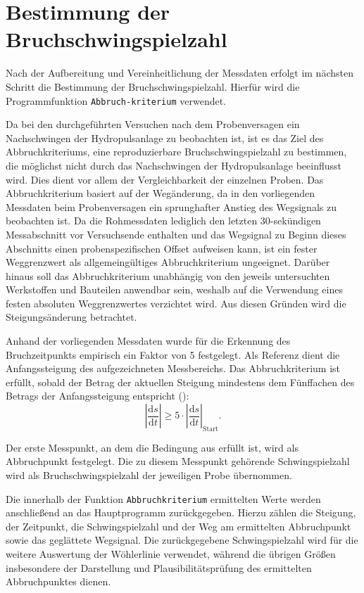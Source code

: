 	\section{Bestimmung der Bruchschwingspielzahl}
	Nach der Aufbereitung und Vereinheitlichung der Messdaten erfolgt im nächsten Schritt die Bestimmung der Bruchschwingspielzahl. Hierfür wird die Programmfunktion \texttt{Abbruch-\newline kriterium} verwendet.
	 
	 Da bei den durchgeführten Versuchen nach dem Probenversagen ein Nachschwingen der Hydropulsanlage zu beobachten ist, ist es das Ziel des Abbruchkriteriums, eine reproduzierbare Bruchschwingspielzahl zu bestimmen, die möglichst nicht durch das Nachschwingen der Hydropulsanlage beeinflusst wird. Dies dient vor allem der Vergleichbarkeit der einzelnen Proben. Das Abbruchkriterium basiert auf der Wegänderung, da in den vorliegenden Messdaten beim Probenversagen ein sprunghafter Anstieg des Wegsignals zu beobachten ist. Da die Rohmessdaten lediglich den letzten 30-sekündigen Messabschnitt vor Versuchsende enthalten und das Wegsignal zu Beginn dieses Abschnitts einen probenspezifischen Offset aufweisen kann, ist ein fester Weggrenzwert als allgemeingültiges Abbruchkriterium ungeeignet. Darüber hinaus soll das Abbruchkriterium unabhängig von den jeweils untersuchten Werkstoffen und Bauteilen anwendbar sein, weshalb auf die Verwendung eines festen absoluten Weggrenzwertes verzichtet wird. Aus diesen Gründen wird die Steigungsänderung betrachtet.
	 
	 Anhand der vorliegenden Messdaten wurde für die Erkennung des Bruchzeitpunkts empirisch ein Faktor von 5 festgelegt. Als Referenz dient die Anfangssteigung des aufgezeichneten Messbereichs. Das Abbruchkriterium ist erfüllt, sobald der Betrag der aktuellen Steigung mindestens dem Fünffachen des Betrags der Anfangssteigung entspricht ():
\begin{equation}
    \left|\frac{\mathrm{d}s}{\mathrm{d}t}\right|
    \geq
    5 \cdot
    \left|\frac{\mathrm{d}s}{\mathrm{d}t}\right|_{\mathrm{Start}}.
    \label{eq:Abbruchkriterium}
\end{equation}
	 
	 Der erste Messpunkt, an dem die Bedingung aus  erfüllt ist, wird als Abbruchpunkt festgelegt. 
Die zu diesem Messpunkt gehörende Schwingspielzahl wird als Bruchschwingspielzahl der jeweiligen Probe übernommen.

Die innerhalb der Funktion \texttt{Abbruchkriterium} ermittelten Werte werden 
anschließend an das Hauptprogramm zurückgegeben. Hierzu zählen die Steigung, 
der Zeitpunkt, die Schwingspielzahl und der Weg am ermittelten Abbruchpunkt 
sowie das geglättete Wegsignal. Die zurückgegebene Schwingspielzahl wird für 
die weitere Auswertung der Wöhlerlinie verwendet, während die übrigen Größen 
insbesondere der Darstellung und Plausibilitätsprüfung des ermittelten 
Abbruchpunktes dienen.

